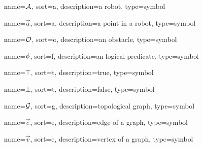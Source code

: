	{%
		name=\ensuremath{\set{A}},
		sort=a,
		description=a robot,
		type=symbol
	}
	\newcommand{\robot}{\gls{sym:robot}}

	{%
		name=\ensuremath{\vec{a}},
		sort=a,
		description=a point in a robot,
		type=symbol
	}
	\newcommand{\pointinrobot}{\gls{sym:pointinrobot}}

	{%
		name=\ensuremath{\set{O}},
		sort=o,
		description=an obstacle,
		type=symbol
	}
	\newcommand{\obstacle}{\gls{sym:obstacle}}

	{%
		name=\ensuremath{\func{\phi}},
		sort=f,
		description=an logical predicate,
		type=symbol
	}
	\newcommand{\logicalpredicate}{\gls{sym:logicalpredicate}}

	{%
		name=\ensuremath{\top},
		sort=t,
		description=true,
		type=symbol
	}
	\newcommand{\true}{\gls{sym:true}}

	{%
		name=\ensuremath{\bot},
		sort=t,
		description=false,
		type=symbol
	}
	\newcommand{\false}{\gls{sym:false}}

	{%
		name=\ensuremath{\set{G}},
		sort=g,
		description=topological graph,
		type=symbol
	}
	\newcommand{\topologicalgraph}{\gls{sym:topologicalgraph}}

	{%
		name=\ensuremath{\vec{e}},
		sort=e,
		description=edge of a graph,
		type=symbol
	}
	\newcommand{\edge}{\gls{sym:edge}}

	{%
		name=\ensuremath{\vec{v}},
		sort=e,
		description=vertex of a graph,
		type=symbol
	}
	\newcommand{\vertex}{\gls{sym:vertex}}
